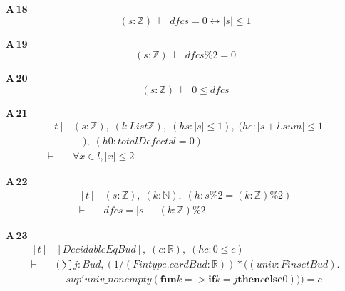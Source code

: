 \noindent\textbf{A\,18}\quad{}
{\footnotesize\[ (\mathit{s} : \mathbb{Z} ) \;\vdash\; \mathit{dfc} \mathit{s} = 0 \leftrightarrow |\mathit{s}| \leq 1 \]}

\noindent\textbf{A\,19}\quad{}
{\footnotesize\[ (\mathit{s} : \mathbb{Z} ) \;\vdash\; \mathit{dfc} \mathit{s} \% 2 = 0 \]}

\noindent\textbf{A\,20}\quad{}
{\footnotesize\[ (\mathit{s} : \mathbb{Z} ) \;\vdash\; 0 \leq \mathit{dfc} \mathit{s} \]}

\noindent\textbf{A\,21}\quad{}
{\footnotesize\[ \begin{aligned}[t]
&(\mathit{s} : \mathbb{Z} ),\; (\mathit{l} : \mathit{List} \mathbb{Z} ),\; (\mathit{hs} : |\mathit{s}| \leq 1),\; (\mathit{he} : |\mathit{s} + \mathit{l}.\mathit{sum}| \leq 1\\
&\quad ),\; (\mathit{h0} : \mathit{totalDefect} \mathit{s} \mathit{l} = 0)\\
\vdash\;&\forall \mathit{x} \in \mathit{l}, |\mathit{x}| \leq 2
\end{aligned} \]}

\noindent\textbf{A\,22}\quad{}
{\footnotesize\[ \begin{aligned}[t]
&(\mathit{s} : \mathbb{Z} ),\; (\mathit{k} : \mathbb{N} ),\; (\mathit{h} : \mathit{s} \% 2 = (\mathit{k} : \mathbb{Z} ) \% 2)\\
\vdash\;&\mathit{dfc} \mathit{s} = |\mathit{s}| - (\mathit{k} : \mathbb{Z} ) \% 2
\end{aligned} \]}

\noindent\textbf{A\,23}\quad{}
{\footnotesize\[ \begin{aligned}[t]
&[\mathit{DecidableEq} \mathit{Bud}],\; (\mathit{c} : \mathbb{R} ),\; (\mathit{hc} : 0 \leq \mathit{c})\\
\vdash\;&(\textstyle\sum \mathit{j} : \mathit{Bud}, (1 / (\mathit{Fintype}.\mathit{card} \mathit{Bud} : \mathbb{R} )) * ((\mathit{univ} : \mathit{Finset} \mathit{Bud}).\\
&\quad \mathit{sup'} \mathit{univ\_nonempty} (\mathbf{fun} \mathit{k} => \mathbf{if} \mathit{k} = \mathit{j} \mathbf{then} \mathit{c} \mathbf{else} 0))) = \mathit{c}
\end{aligned} \]}

